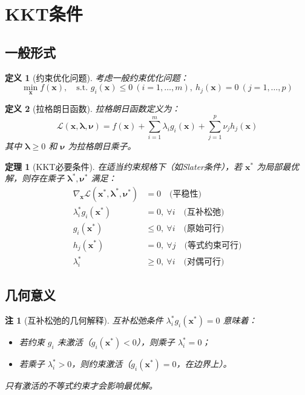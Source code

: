 \documentclass[UTF8, 10pt]{ctexart}
\newtheorem{theorem}{定理}[section]
\newtheorem{definition}{定义}[section]
\newtheorem{remark}{注}[section]
\begin{document}
\section{KKT条件}
\subsection{一般形式}
\begin{definition}[约束优化问题]
考虑一般约束优化问题：
\[
\min_{\bm{x}} f(\bm{x}),\quad \text{s.t. } g_i(\bm{x}) \le 0\ (i=1,\ldots,m),\ h_j(\bm{x}) = 0\ (j=1,\ldots,p)
\]
\end{definition}

\begin{definition}[拉格朗日函数]
拉格朗日函数定义为：
\[
\mathcal{L}(\bm{x},\bm{\lambda},\bm{\nu}) = f(\bm{x}) + \sum_{i=1}^{m} \lambda_i g_i(\bm{x}) + \sum_{j=1}^{p} \nu_j h_j(\bm{x})
\]
其中 $\bm{\lambda} \ge 0$ 和 $\bm{\nu}$ 为拉格朗日乘子。
\end{definition}

\begin{theorem}[KKT必要条件]
在适当约束规格下（如Slater条件），若 $\bm{x}^*$ 为局部最优解，则存在乘子 $\bm{\lambda}^*, \bm{\nu}^*$ 满足：
\begin{align}
    \nabla_{\bm{x}} \mathcal{L}(\bm{x}^*, \bm{\lambda}^*, \bm{\nu}^*) &= 0 \quad \text{(平稳性)} \label{eq:stationarity}\\
    \lambda_i^* g_i(\bm{x}^*) &= 0,\ \forall i \quad \text{(互补松弛)} \label{eq:complementarity}\\
    g_i(\bm{x}^*) &\le 0,\ \forall i \quad \text{(原始可行)} \label{eq:primal}\\
    h_j(\bm{x}^*) &= 0,\ \forall j \quad \text{(等式约束可行)} \label{eq:equality}\\
    \lambda_i^* &\ge 0,\ \forall i \quad \text{(对偶可行)} \label{eq:dual}
\end{align}
\end{theorem}

\subsection{几何意义}
\begin{remark}[互补松弛的几何解释]
互补松弛条件 $\lambda_i^* g_i(\bm{x}^*) = 0$ 意味着：
\begin{itemize}
    \item 若约束 $g_i$ 未激活（$g_i(\bm{x}^*) < 0$），则乘子 $\lambda_i^* = 0$；
    \item 若乘子 $\lambda_i^* > 0$，则约束激活（$g_i(\bm{x}^*) = 0$，在边界上）。
\end{itemize}
只有激活的不等式约束才会影响最优解。
\end{remark}
\end{document}
